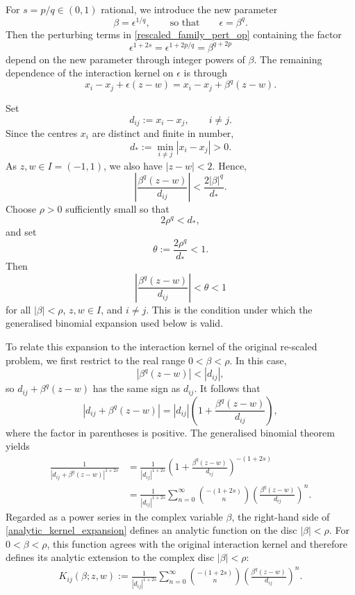 \documentclass[preprint,12pt]{elsarticle}
\begin{document}
For $s=p/q\in(0,1)$ rational, we introduce the new parameter
\[
    \beta=\epsilon^{1/q},
    \qquad\text{so that}\qquad
    \epsilon=\beta^q.
\]
Then the perturbing terms in \eqref{rescaled_family_pert_op} containing
the factor
\[
    \epsilon^{1+2s}
    =
    \epsilon^{1+2p/q}
    =
    \beta^{q+2p}
\]
depend on the new parameter through integer powers of $\beta$. The
remaining dependence of the interaction kernel on $\epsilon$ is through
\[
    x_i-x_j+\epsilon(z-w)
    =
    x_i-x_j+\beta^q(z-w).
\]

Set
\[
    d_{ij}:=x_i-x_j,
    \qquad i\neq j.
\]
Since the centres $x_i$ are distinct and finite in number,
\[
    d_*:=\min_{i\neq j}|x_i-x_j|>0.
\]
As $z,w\in I=(-1,1)$, we also have $|z-w|<2$. Hence,
\[
    \left|
    \frac{\beta^q(z-w)}{d_{ij}}
    \right|
    <
    \frac{2|\beta|^q}{d_*}.
\]
Choose $\rho>0$ sufficiently small so that
\[
    2\rho^q<d_*,
\]
and set
\[
    \theta:=\frac{2\rho^q}{d_*}<1.
\]
Then
\[
    \left|
    \frac{\beta^q(z-w)}{d_{ij}}
    \right|
    <\theta<1
\]
for all $|\beta|<\rho$, $z,w\in I$, and $i\neq j$. This is
the condition under which the generalised binomial expansion used below
is valid.

To relate this expansion to the interaction kernel of the original
re-scaled problem, we first restrict to the real range
$0<\beta<\rho$. In this case,
\[
    |\beta^q(z-w)|<|d_{ij}|,
\]
so $d_{ij}+\beta^q(z-w)$ has the same sign as $d_{ij}$. It follows that
\[
    |d_{ij}+\beta^q(z-w)|
    =
    |d_{ij}|
    \left(
        1+\frac{\beta^q(z-w)}{d_{ij}}
    \right),
\]
where the factor in parentheses is positive. The generalised binomial theorem yields
\begin{align}\label{analytic_kernel_expansion}
\frac{1}{|d_{ij}+\beta^q(z-w)|^{1+2s}}
&=
\frac{1}{|d_{ij}|^{1+2s}}
\left(
1+\frac{\beta^q(z-w)}{d_{ij}}
\right)^{-(1+2s)}
\nonumber\\
&=
\frac{1}{|d_{ij}|^{1+2s}}
\sum_{n=0}^{\infty}
\binom{-(1+2s)}{n}
\left(
\frac{\beta^q(z-w)}{d_{ij}}
\right)^n.
\end{align}
Regarded as a power series in the complex
variable $\beta$, the right-hand side of
\eqref{analytic_kernel_expansion} defines an analytic function on the disc
$|\beta|<\rho$. For $0<\beta<\rho$, this function agrees with the
original interaction kernel and therefore defines its analytic extension
to the complex disc $|\beta|<\rho$:
\begin{align}\label{definition_analytic_kernel}
    K_{ij}(\beta;z,w)
    :=
    \frac{1}{|d_{ij}|^{1+2s}}
    \sum_{n=0}^{\infty}
    \binom{-(1+2s)}{n}
    \left(
        \frac{\beta^q(z-w)}{d_{ij}}
    \right)^n.
\end{align}
\end{document}
